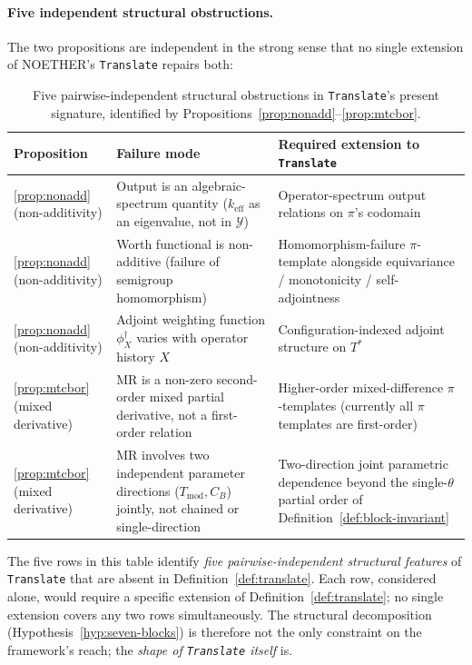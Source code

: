 \documentclass[manuscript]{acmart}
\begin{document}
\paragraph{Five independent structural obstructions.}
\label{subsubsec:obstruction set}

The two propositions are independent in the strong sense that no single extension of NOETHER's \texttt{Translate} repairs both:

\begin{table}[h]
\centering
\caption{Five pairwise-independent structural obstructions in \texttt{Translate}'s present signature, identified by Propositions~\ref{prop:nonadd}--\ref{prop:mtcbor}.}
\label{tab:obstruction set}
\footnotesize
\begin{tabular}{p{} p{} p{}}
\toprule
\textbf{Proposition} & \textbf{Failure mode} & \textbf{Required extension to \texttt{Translate}} \\
\midrule
\ref{prop:nonadd} (non-additivity) & Output is an algebraic-spectrum quantity ($k_{\mathrm{eff}}$ as an eigenvalue, not in $\mathcal{Y}$) & Operator-spectrum output relations on $\pi$'s codomain \\
\addlinespace
\ref{prop:nonadd} (non-additivity) & Worth functional is non-additive (failure of semigroup homomorphism) & Homomorphism-failure $\pi$-template alongside equivariance / monotonicity / self-adjointness \\
\addlinespace
\ref{prop:nonadd} (non-additivity) & Adjoint weighting function $\phi^{\dagger}_{X}$ varies with operator history $X$ & Configuration-indexed adjoint structure on $T^{*}$ \\
\addlinespace
\ref{prop:mtcbor} (mixed derivative) & MR is a non-zero second-order mixed partial derivative, not a first-order relation & Higher-order mixed-difference $\pi$-templates (currently all $\pi$ templates are first-order) \\
\addlinespace
\ref{prop:mtcbor} (mixed derivative) & MR involves two independent parameter directions ($T_{\mathrm{mod}}, C_{B}$) jointly, not chained or single-direction & Two-direction joint parametric dependence beyond the single-$\theta$ partial order of Definition~\ref{def:block-invariant} \\
\bottomrule
\end{tabular}
\end{table}

The five rows in this table identify \emph{five pairwise-independent structural features} of \texttt{Translate} that are absent in Definition~\ref{def:translate}. Each row, considered alone, would require a specific extension of Definition~\ref{def:translate}; no single extension covers any two rows simultaneously. The structural decomposition (Hypothesis~\ref{hyp:seven-blocks}) is therefore not the only constraint on the framework's reach; the \emph{shape of \texttt{Translate} itself} is.
\end{document}
